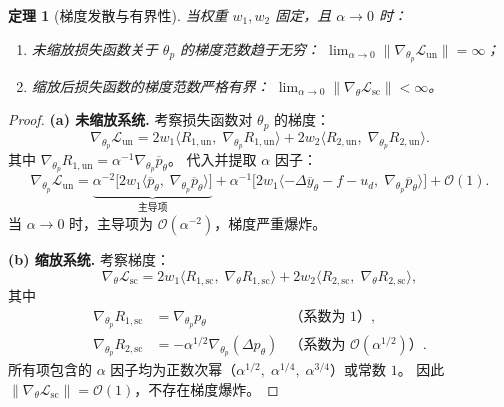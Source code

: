 \documentclass[UTF8, 12pt]{ctexart}
\newtheorem{theorem}{定理}[section]
\begin{document}
\begin{theorem}[梯度发散与有界性]
\label{thm:gradient-divergence}
当权重 $w_1, w_2$ 固定，且 $\alpha\to 0$ 时：
\begin{enumerate}[label=(\alph*)]
  \item 未缩放损失函数关于 $\theta_p$ 的梯度范数趋于无穷：
    $\displaystyle\lim_{\alpha\to 0}\|\nabla_{\theta_p}\mathcal{L}_{\mathrm{un}}\| = \infty$；
  \item 缩放后损失函数的梯度范数严格有界：
    $\displaystyle\lim_{\alpha\to 0}\|\nabla_\theta\mathcal{L}_{\mathrm{sc}}\| < \infty$。
\end{enumerate}
\end{theorem}

\begin{proof}
\textbf{(a) 未缩放系统.}\;
考察损失函数对 $\theta_p$ 的梯度：
\begin{equation}
  \nabla_{\theta_p}\mathcal{L}_{\mathrm{un}}
  = 2w_1\langle R_{1,\mathrm{un}},\;\nabla_{\theta_p}R_{1,\mathrm{un}}\rangle
  + 2w_2\langle R_{2,\mathrm{un}},\;\nabla_{\theta_p}R_{2,\mathrm{un}}\rangle.
  \label{eq:grad-un}
\end{equation}
其中 $\nabla_{\theta_p}R_{1,\mathrm{un}} = \alpha^{-1}\nabla_{\theta_p}\overline{p}_\theta$。
代入并提取 $\alpha$ 因子：
\begin{equation}
  \nabla_{\theta_p}\mathcal{L}_{\mathrm{un}}
  = \underbrace{\alpha^{-2}\bigl[2w_1\langle\overline{p}_\theta,\;\nabla_{\theta_p}\overline{p}_\theta\rangle\bigr]}_{\text{主导项}}
  + \alpha^{-1}\bigl[2w_1\langle -\Delta\overline{y}_\theta - f - u_d,\;\nabla_{\theta_p}\overline{p}_\theta\rangle\bigr]
  + \mathcal{O}(1).
  \label{eq:grad-un-expand}
\end{equation}
当 $\alpha\to 0$ 时，主导项为 $\mathcal{O}(\alpha^{-2})$，梯度严重爆炸。

\medskip
\textbf{(b) 缩放系统.}\;
考察梯度：
\begin{equation}
  \nabla_\theta\mathcal{L}_{\mathrm{sc}}
  = 2w_1\langle R_{1,\mathrm{sc}},\;\nabla_\theta R_{1,\mathrm{sc}}\rangle
  + 2w_2\langle R_{2,\mathrm{sc}},\;\nabla_\theta R_{2,\mathrm{sc}}\rangle,
  \label{eq:grad-sc}
\end{equation}
其中
\begin{align}
  \nabla_{\theta_p}R_{1,\mathrm{sc}} &= \nabla_{\theta_p}p_\theta
    &\text{（系数为 $1$）},   \label{eq:grad-sc-R1}\\
  \nabla_{\theta_p}R_{2,\mathrm{sc}} &= -\alpha^{1/2}\nabla_{\theta_p}(\Delta p_\theta)
    &\text{（系数为 $\mathcal{O}(\alpha^{1/2})$）}. \label{eq:grad-sc-R2}
\end{align}
所有项包含的 $\alpha$ 因子均为正数次幂（$\alpha^{1/2},\;\alpha^{1/4},\;\alpha^{3/4}$）或常数 $1$。
因此 $\|\nabla_\theta\mathcal{L}_{\mathrm{sc}}\| = \mathcal{O}(1)$，不存在梯度爆炸。
\end{proof}
\end{document}
